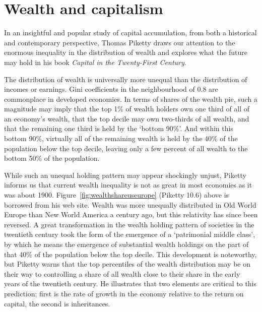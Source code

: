 \section{Wealth and capitalism}\label{sec:ch13sec8}

In an insightful and popular study of capital accumulation, from both a
historical and contemporary perspective, Thomas Piketty draws our attention
to the enormous inequality in the distribution of wealth and explores what
the future may hold in his book \textit{Capital in the Twenty-First Century}.

The distribution of wealth is universally more unequal than the distribution
of incomes or earnings. Gini coefficients in the neighbourhood of 0.8 are
commonplace in developed economies. In terms of shares of the wealth pie,
such a magnitude may imply that the top 1\% of wealth holders own one third
of all of an economy's wealth, that the top decile may own two-thirds of all
wealth, and that the remaining one third is held by the `bottom 90\%'. And
within this bottom 90\%, virtually all of the remaining wealth is held by
the 40\% of the population below the top decile, leaving only a few percent
of all wealth to the bottom 50\% of the population.



\newhtmlpage

While such an unequal holding pattern may appear shockingly unjust, Piketty
informs us that current wealth inequality is not as great in most economies
as it was about 1900. Figure~\ref{fig:wealthshareuseurope} (Piketty 10.6)
above is borrowed from his web site. Wealth was more unequally distributed
in Old World Europe than New World America a century ago, but this
relativity has since been reversed. A great transformation in the wealth
holding pattern of societies in the twentieth century took the form of the
emergence of a `patrimonial middle class', by which he means the emergence
of substantial wealth holdings on the part of that 40\% of the population
below the top decile. This development is noteworthy, but Piketty warns that
the top percentiles of the wealth distribution may be on their way to
controlling a share of all wealth close to their share in the early years of
the twentieth century. He illustrates that two elements are critical to this
prediction; first is the rate of growth in the economy relative to the
return on capital, the second is inheritances.

